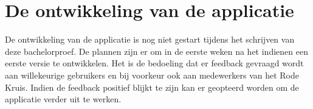\section{De ontwikkeling van de applicatie}
De ontwikkeling van de applicatie is nog niet gestart tijdens het schrijven van deze bachelorproef. De plannen zijn er om in de eerste weken na het indienen een eerste versie te ontwikkelen. Het is de bedoeling dat er feedback gevraagd wordt aan willekeurige gebruikers en bij voorkeur ook aan medewerkers van het Rode Kruis. Indien de feedback positief blijkt te zijn kan er geopteerd worden om de applicatie verder uit te werken.


